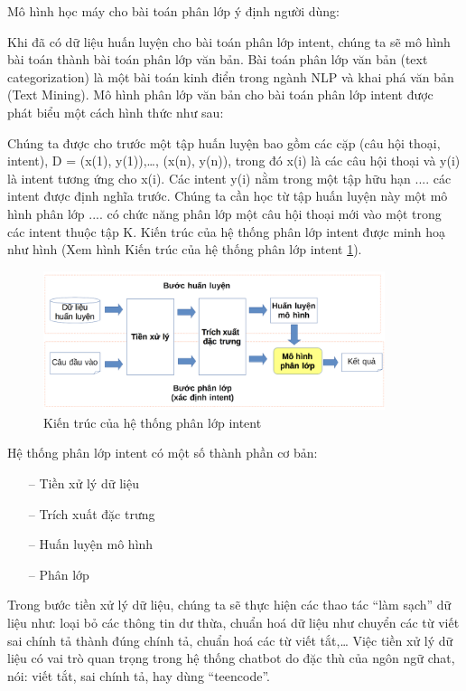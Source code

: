 Mô hình học máy cho bài toán phân lớp ý định người dùng:

Khi đã có dữ liệu huấn luyện cho bài toán phân lớp intent, chúng ta sẽ mô hình bài toán thành bài toán phân lớp văn bản. Bài toán phân lớp văn bản (text categorization) là một bài toán kinh điển trong ngành NLP và khai phá văn bản (Text Mining). Mô hình phân lớp văn bản cho bài toán phân lớp intent được phát biểu một cách hình thức như sau:

Chúng ta được cho trước một tập huấn luyện bao gồm các cặp (câu hội thoại, intent), D = {(x(1), y(1)),…, (x(n), y(n))}, trong đó x(i) là các câu hội thoại và y(i) là intent tương ứng cho x(i). Các intent y(i) nằm trong một tập hữu hạn .... các intent được định nghĩa trước. Chúng ta cần học từ tập huấn luyện này một mô hình phân lớp .... có chức năng phân lớp một câu hội thoại mới vào một trong các intent thuộc tập K. Kiến trúc của hệ thống phân lớp intent được minh hoạ như hình (Xem hình Kiến trúc của hệ thống phân lớp intent \ref{fig:system-class-intent}).
\begin{figure}[htp]
    \centering
    \includegraphics[width=10cm]{images/structure-system-class-intent.png}
    \caption{Kiến trúc của hệ thống phân lớp intent}
    \label{fig:system-class-intent}
\end{figure}

Hệ thống phân lớp intent có một số thành phần cơ bản:
\begin{itemize}
    \item[--] Tiền xử lý dữ liệu
    \item[--] Trích xuất đặc trưng
    \item[--] Huấn luyện mô hình
    \item[--] Phân lớp
\end{itemize}
Trong bước tiền xử lý dữ liệu, chúng ta sẽ thực hiện các thao tác “làm sạch” dữ liệu như: loại bỏ các thông tin dư thừa, chuẩn hoá dữ liệu như chuyển các từ viết sai chính tả thành đúng chính tả, chuẩn hoá các từ viết tắt,… Việc tiền xử lý dữ liệu có vai trò quan trọng trong hệ thống chatbot do đặc thù của ngôn ngữ chat, nói: viết tắt, sai chính tả, hay dùng “teencode”.

